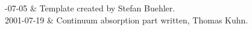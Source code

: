 %
%
 \label{sec:absorption}


%
%
-07-05 & Template created by Stefan Buehler.\\
  2001-07-19 & Continuum absorption part written, Thomas Kuhn.\\
\stophistory
%
%
%

